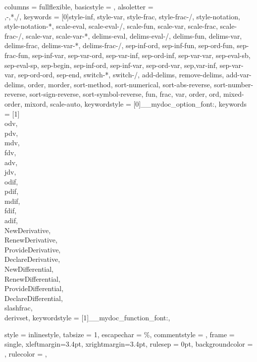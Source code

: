 {
	columns = fullflexible,
	basicstyle = \ttfamily\upshape\small,
	alsoletter =  {\\,-,*,/},
	keywords = [0]{style-inf, style-var, style-frac, style-frac-/, style-notation, style-notation-*, scale-eval, scale-eval-/, scale-fun, scale-var, scale-frac, scale-frac-/, scale-var, scale-var-*, delims-eval, delims-eval-/, delims-fun, delims-var, delims-frac, delims-var-*, delims-frac-/, sep-inf-ord, sep-inf-fun, sep-ord-fun, sep-frac-fun, sep-inf-var, sep-var-ord, sep-var-inf, sep-ord-inf, sep-var-var, sep-eval-sb, sep-eval-sp, sep-begin, sep-inf-ord, sep-inf-var, sep-ord-var, sep,var-inf, sep-var-var, sep-ord-ord, sep-end, switch-*, switch-/, add-delims, remove-delims, add-var-delims, order, morder, sort-method, sort-numerical, sort-abs-reverse, sort-number-reverse, sort-sign-reverse, sort-symbol-reverse, fun, frac, var, order, ord, mixed-order, mixord, scale-auto},
	keywordstyle = [0]\__mydoc_option_font:,
	keywords = [1]{\\odv, \\pdv, \\mdv, \\fdv, \\adv, \\jdv, \\odif, \\pdif, \\mdif, \\fdif, \\adif, \\NewDerivative, \\RenewDerivative, \\ProvideDerivative, \\DeclareDerivative, \\NewDifferential, \\RenewDifferential, \\ProvideDifferential, \\DeclareDifferential, \\slashfrac, \\derivset},
	keywordstyle = [1]\__mydoc_function_font:,
}

{
	style = inlinestyle,
	tabsize = 1,
	escapechar = \%,
	commentstyle = \footnotesize,
	frame = single,
	xleftmargin=3.4pt,
	xrightmargin=3.4pt,
	rulesep = 0pt,
	backgroundcolor = \color{RoyalLightGray},
	rulecolor = \color{RoyalGray},
}


